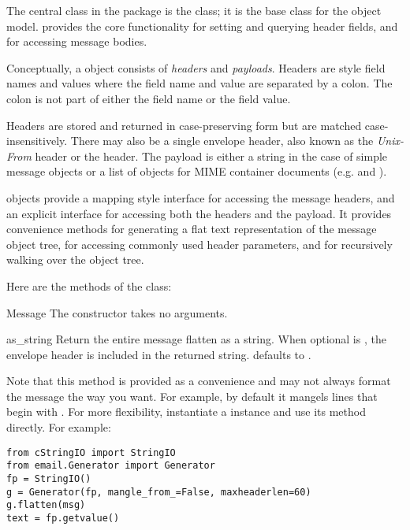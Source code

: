 
The central class in the  package is the
 class; it is the base class for the 
object model.   provides the core functionality for
setting and querying header fields, and for accessing message bodies.

Conceptually, a  object consists of \emph{headers} and
\emph{payloads}.  Headers are  style field names and
values where the field name and value are separated by a colon.  The
colon is not part of either the field name or the field value.

Headers are stored and returned in case-preserving form but are
matched case-insensitively.  There may also be a single envelope
header, also known as the \emph{Unix-From} header or the
 header.  The payload is either a string in the case of
simple message objects or a list of  objects for
MIME container documents (e.g.  and
).

 objects provide a mapping style interface for
accessing the message headers, and an explicit interface for accessing
both the headers and the payload.  It provides convenience methods for
generating a flat text representation of the message object tree, for
accessing commonly used header parameters, and for recursively walking
over the object tree.

Here are the methods of the  class:

\begin{classdesc}{Message}{}
The constructor takes no arguments.
\end{classdesc}

\begin{methoddesc}[Message]{as_string}{}
Return the entire message flatten as a string.  When optional
 is , the envelope header is included in the
returned string.   defaults to .

Note that this method is provided as a convenience and may not always format
the message the way you want.  For example, by default it mangels lines that
begin with .  For more flexibility, instantiate a
 instance and use its
 method directly.  For example:

\begin{verbatim}
from cStringIO import StringIO
from email.Generator import Generator
fp = StringIO()
g = Generator(fp, mangle_from_=False, maxheaderlen=60)
g.flatten(msg)
text = fp.getvalue()
\end{verbatim}
\end{methoddesc}


